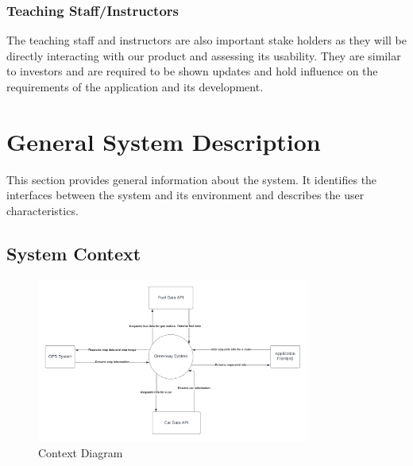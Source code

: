 \documentclass[12pt]{article}
\begin{document}
\subsubsection{Teaching Staff/Instructors}
The teaching staff and instructors are also important stake holders as they will be directly interacting with our product and assessing its usability. They are similar to investors and are required to be shown updates and hold influence on the requirements of the application and its development.

\section{General System Description}

This section provides general information about the system.  It identifies the
interfaces between the system and its environment and describes the user
characteristics.

\subsection{System Context}

\begin{figure}[h!]
\begin{center}
 \includegraphics[width=0.8\textwidth]{ContextDiagram.png}
\caption{Context Diagram}
\label{Fig_SystemContext} 
\end{center}
\end{figure}
\end{document}
